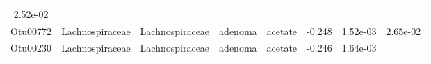 \documentclass[11pt,]{article}
\begin{document}
\begin{longtable}[]{@{}cccccccc@{}}
\begin{minipage}[t]{0.08\columnwidth}
2.52e-02\strut
\end{minipage}\tabularnewline
\begin{minipage}[t]{0.08\columnwidth}\centering\strut
Otu00772\strut
\end{minipage} & \begin{minipage}[t]{0.15\columnwidth}\centering\strut
Lachnospiraceae\strut
\end{minipage} & \begin{minipage}[t]{0.15\columnwidth}\centering\strut
Lachnospiraceae\strut
\end{minipage} & \begin{minipage}[t]{0.08\columnwidth}\centering\strut
adenoma\strut
\end{minipage} & \begin{minipage}[t]{0.09\columnwidth}\centering\strut
acetate\strut
\end{minipage} & \begin{minipage}[t]{0.07\columnwidth}\centering\strut
-0.248\strut
\end{minipage} & \begin{minipage}[t]{0.08\columnwidth}\centering\strut
1.52e-03\strut
\end{minipage} & \begin{minipage}[t]{0.08\columnwidth}\centering\strut
2.65e-02\strut
\end{minipage}\tabularnewline
\begin{minipage}[t]{0.08\columnwidth}\centering\strut
Otu00230\strut
\end{minipage} & \begin{minipage}[t]{0.15\columnwidth}\centering\strut
Lachnospiraceae\strut
\end{minipage} & \begin{minipage}[t]{0.15\columnwidth}\centering\strut
Lachnospiraceae\strut
\end{minipage} & \begin{minipage}[t]{0.08\columnwidth}\centering\strut
adenoma\strut
\end{minipage} & \begin{minipage}[t]{0.09\columnwidth}\centering\strut
acetate\strut
\end{minipage} & \begin{minipage}[t]{0.07\columnwidth}\centering\strut
-0.246\strut
\end{minipage} & \begin{minipage}[t]{0.08\columnwidth}\centering\strut
1.64e-03\strut
\end{minipage} & \begin{minipage}[t]{0.08\columnwidth}\centering\strut

\end{minipage}
\end{longtable}
\end{document}
